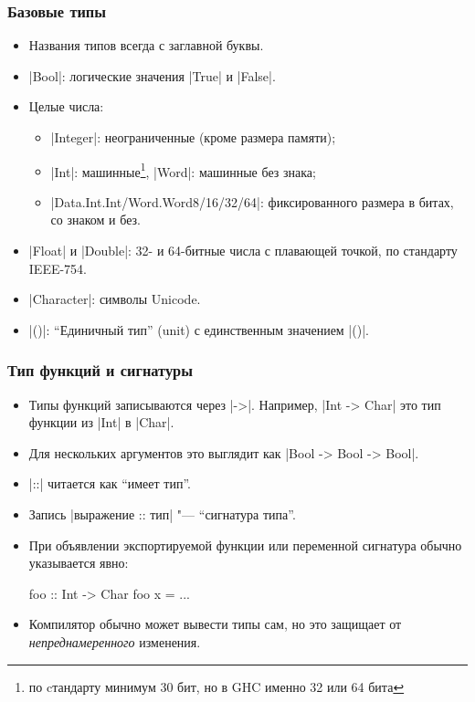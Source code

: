 \documentclass[10pt]{beamer}
\begin{document}
\begin{frame}[fragile]
  \frametitle{Базовые типы}
  \begin{itemize}
    \item Названия типов всегда с заглавной буквы.
    \item \haskinline|Bool|: логические значения \haskinline|True| и \haskinline|False|.
    \item Целые числа:
          \begin{itemize}
            \item \haskinline|Integer|: неограниченные (кроме размера памяти);
            \item \haskinline|Int|: машинные\footnote{по cтандарту минимум 30 бит, но в GHC именно 32 или 64 бита}, \haskinline|Word|: машинные без знака;
            \item \haskinline|Data.{Int.Int/Word.Word}{8/16/32/64}|: фиксированного размера в битах, со знаком и без.
          \end{itemize}
    \item \haskinline|Float| и \haskinline|Double|: 32- и 64-битные числа с плавающей точкой, по стандарту IEEE-754.
    \item \haskinline|Character|: символы Unicode.
    \item \haskinline|()|: \enquote{Единичный тип} (unit) с единственным значением \haskinline|()|.
  \end{itemize}
\end{frame}

\begin{frame}[fragile]
  \frametitle{Тип функций и сигнатуры}
  \begin{itemize}
    \item Типы функций записываются через \haskinline|->|. Например, \haskinline|Int -> Char| это тип функции из \haskinline|Int| в \haskinline|Char|.

    \item Для нескольких аргументов это выглядит как \pause\haskinline|Bool -> Bool -> Bool|.

    \item \haskinline|::| читается как \enquote{имеет тип}.

    \item Запись \haskinline|выражение :: тип| "--- \enquote{сигнатура типа}.

    \item При объявлении экспортируемой функции или переменной  сигнатура обычно указывается явно:
          \begin{haskell}
            foo :: Int -> Char
            foo x = ...
          \end{haskell}
    \item Компилятор обычно может вывести типы сам, но это защищает от \emph{непреднамеренного} изменения.
  \end{itemize}
\end{frame}
\end{document}
